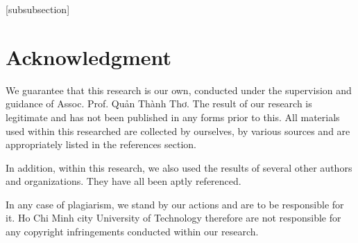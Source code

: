 \documentclass[a4paper,12pt,oneside]{report}
\begin{document}
\newpage


\pagestyle{plain}
\renewcommand{\headrulewidth}{0pt}
\renewcommand{\footrulewidth}{0.3pt}


\setcounter{secnumdepth}{4}
\setcounter{tocdepth}{3}
\makeatletter
{}[subsubsection]
\renewcommand\thesubsubsubsection{\thesubsubsection .\@alph\c@subsubsubsection}
\newcommand\subsubsubsection{\@startsection{subsubsubsection}{4}{\z@}%
                                     {-3.25ex\@plus -1ex \@minus -.2ex}%
                                     {1.5ex \@plus .2ex}%
                                     {\normalfont\normalsize\bfseries}}
\newcommand*\l@subsubsubsection{\@dottedtocline{3}{10.0em}{4.1em}}
\newcommand*{\subsubsubsectionmark}[1]{}
\makeatother


\hypersetup{
    urlcolor = black,
    linkcolor = black,
    citecolor = black,
    hidelinks
}





\chapter*{Acknowledgment} %
We guarantee that this research is our own, conducted under the supervision and  guidance of Assoc. Prof. Quản Thành Thơ. The result of our research is legitimate and has not been published in any forms prior to this. All materials used within this researched are collected by ourselves, by various sources and are appropriately listed in the references section.

In addition, within this research, we also used the results of several other authors and organizations. They have all been aptly referenced.

In any case of plagiarism, we stand by our actions and are to be responsible for it. Ho Chi Minh city University of Technology therefore are not responsible for any copyright infringements conducted within our research.
\end{document}
